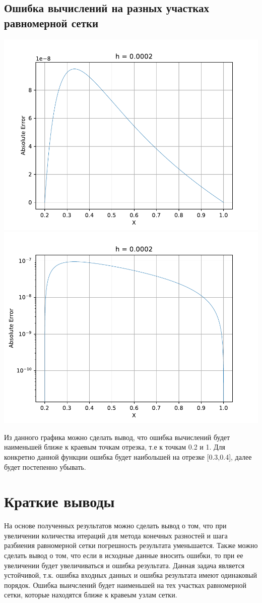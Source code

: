 \subsection{Ошибка вычислений на разных участках равномерной сетки}

\includegraphics[scale=0.5]{4.pdf}
\includegraphics[scale=0.5]{5.pdf}


Из данного графика можно сделать вывод, что ошибка вычислений будет наименьшей ближе к краевым точкам отрезка, т.е к точкам 0.2 и 1. Для конкретно данной функции ошибка будет наибольшей на отрезке [0.3,0.4], далее будет постепенно убывать. 


\section{Краткие выводы}

На основе полученных результатов можно сделать вывод о том, что при увеличении количества итераций для метода конечных разностей и шага разбиения равномерной сетки погрешность результата уменьшается. Также можно сделать вывод о том, что если в исходные данные вносить ошибки, то при ее увеличении будет увеличиваться и ошибка результата. Данная задача является устойчивой, т.к. ошибка входных данных и ошибка результата имеют одинаковый порядок. Ошибка выичслений будет наименьшей на тех участках равномерной сетки, которые находятся ближе к кравеым узлам сетки. 


